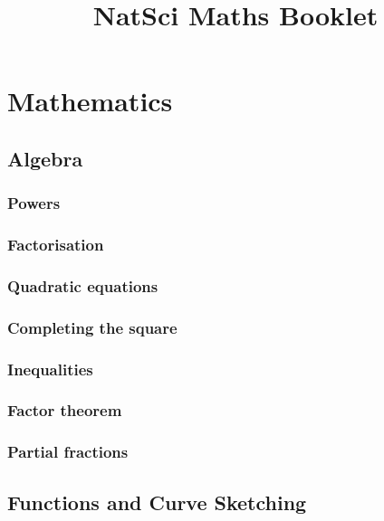 \documentclass{article}
\title{NatSci Maths Booklet}
\begin{document}
\maketitle

\section{Mathematics}
\subsection{Algebra}
\subsubsection{Powers}


\subsubsection{Factorisation}


\subsubsection{Quadratic equations}


\subsubsection{Completing the square}


\subsubsection{Inequalities}


\subsubsection{Factor theorem}


\subsubsection{Partial fractions}



\subsection{Functions and Curve Sketching}
\end{document}
